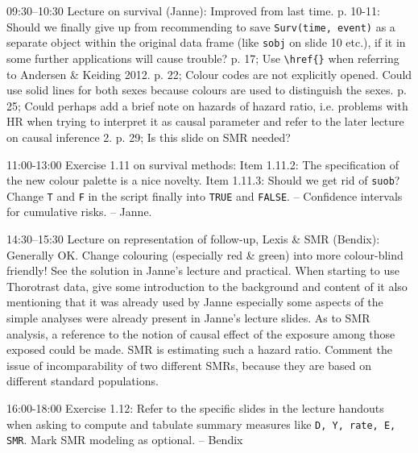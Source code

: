 \documentclass[11pt,a4]{article}
\begin{document}
09:30--10:30 Lecture on survival (Janne): Improved from last time. 
p. 10-11: Should we finally give up from recommending to save \texttt{Surv(time, event)} as a separate object within the
original data frame (like \texttt{sobj} on slide 10 etc.), if it
in some further applications will cause trouble? 
p. 17; Use \verb|\href{}| when referring to Andersen \& Keiding 2012.
p. 22; Colour codes are not explicitly opened. Could use solid lines for both sexes
because colours are used to distinguish the sexes.
p. 25; Could perhaps add a brief note on hazards of hazard ratio, i.e. 
problems with HR when trying to interpret it as causal parameter and 
refer to the later lecture on causal inference 2.  
p. 29; Is this slide on SMR needed?

11:00-13:00 Exercise 1.11 on survival methods: %
Item 1.11.2: The specification of the new colour palette is a nice novelty.
Item 1.11.3: Should we get rid of \texttt{suob}?
Change \texttt{T} and \texttt{F} in the script finally
into \texttt{TRUE} and \texttt{FALSE}. -- Confidence intervals for cumulative risks.
-- Janne.  


14:30--15:30 Lecture on representation of follow-up, Lexis \& SMR (Bendix): Generally OK. 
Change colouring (especially red \& green) into more 
colour-blind friendly! See the solution in Janne's lecture and practical.
 When starting to use Thorotrast data, give some introduction
to the background and content of it also mentioning that it was already used by Janne
especially some aspects of the simple analyses were already present in Janne's lecture slides.  
As to SMR analysis, a reference to the notion of causal effect of the exposure among those
exposed could be made. SMR is estimating such a hazard ratio.
Comment the issue of incomparability of two different SMRs,
because they are based on different standard populations.


16:00-18:00 Exercise 1.12: Refer to the specific slides in the lecture handouts 
when asking to compute and tabulate summary measures like {\tt D, Y, rate, E, SMR}.
Mark SMR modeling as optional. -- Bendix
\end{document}
